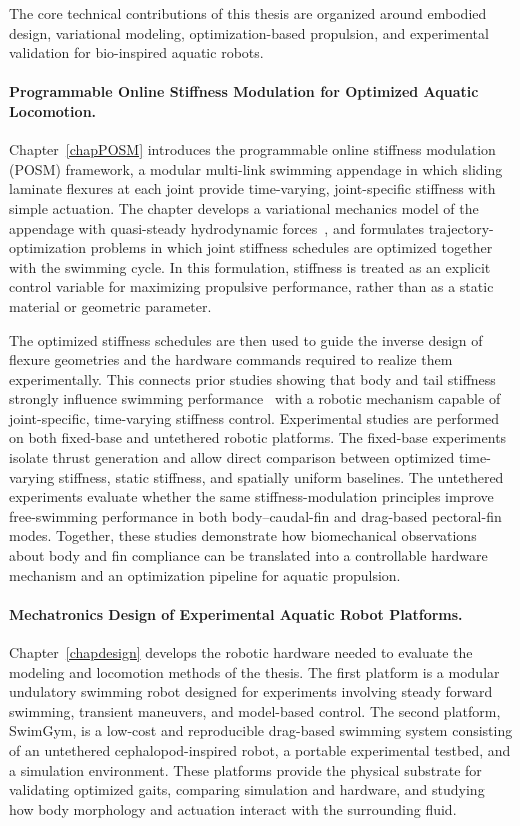 The core technical contributions of this thesis are organized around embodied design, variational modeling, optimization-based propulsion, and experimental validation for bio-inspired aquatic robots.

\paragraph{Programmable Online Stiffness Modulation for Optimized Aquatic Locomotion.}
Chapter~\ref{chapPOSM} introduces the programmable online stiffness modulation (POSM) framework, a modular multi-link swimming appendage in which sliding laminate flexures at each joint provide time-varying, joint-specific stiffness with simple actuation. The chapter develops a variational mechanics model of the appendage with quasi-steady hydrodynamic forces~\cite{najafi_numerical_2017,izadi_rigid_2014}, and formulates trajectory-optimization problems in which joint stiffness schedules are optimized together with the swimming cycle. In this formulation, stiffness is treated as an explicit control variable for maximizing propulsive performance, rather than as a static material or geometric parameter.

The optimized stiffness schedules are then used to guide the inverse design of flexure geometries and the hardware commands required to realize them experimentally. This connects prior studies showing that body and tail stiffness strongly influence swimming performance~\cite{john_h_long_importance_1996,tytell2016role,zhong_tunable_2021,quinn2022tunable} with a robotic mechanism capable of joint-specific, time-varying stiffness control. Experimental studies are performed on both fixed-base and untethered robotic platforms. The fixed-base experiments isolate thrust generation and allow direct comparison between optimized time-varying stiffness, static stiffness, and spatially uniform baselines. The untethered experiments evaluate whether the same stiffness-modulation principles improve free-swimming performance in both body--caudal-fin and drag-based pectoral-fin modes. Together, these studies demonstrate how biomechanical observations about body and fin compliance can be translated into a controllable hardware mechanism and an optimization pipeline for aquatic propulsion.

\paragraph{Mechatronics Design of Experimental Aquatic Robot Platforms.}
Chapter~\ref{chapdesign} develops the robotic hardware needed to evaluate the modeling and locomotion methods of the thesis. The first platform is a modular undulatory swimming robot designed for experiments involving steady forward swimming, transient maneuvers, and model-based control. The second platform, SwimGym, is a low-cost and reproducible drag-based swimming system consisting of an untethered cephalopod-inspired robot, a portable experimental testbed, and a simulation environment. These platforms provide the physical substrate for validating optimized gaits, comparing simulation and hardware, and studying how body morphology and actuation interact with the surrounding fluid.

